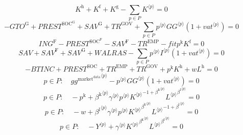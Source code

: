 \begin{equation}
K^{\mathrm{h}} + K^{\mathrm{f}} + K^{\mathrm{g}} - \sum_{p\in P} {K}^{\langle p\rangle} = 0
\end{equation}
\begin{equation}
-{G\!T\!O}^{\mathrm{G}} + {P\!R\!E\!S\!T}^{\mathrm{SOC}^{\mathrm{G}}} + {S\!A\!V}^{\mathrm{G}} + {T\!R}^{\mathrm{GOV}} + \sum_{p\in P} {{p}^{\langle p\rangle}} {{{G\!G}}^{\langle p\rangle}} \left(1 + {{v\!a\!t}}^{\langle p\rangle}\right) = 0
\end{equation}
\begin{equation}
{I\!N\!G}^{\mathrm{F}} - {P\!R\!E\!S\!T}^{\mathrm{SOC}^{\mathrm{F}}} - {S\!A\!V}^{\mathrm{F}} - {T\!R}^{\mathrm{EMP}} - {{f\!i\!t}} {p^{\mathrm{k}}} {K^{\mathrm{f}}} = 0
\end{equation}
\begin{equation}
{S\!A\!V} + {S\!A\!V}^{\mathrm{F}} + {S\!A\!V}^{\mathrm{G}} + {W\!A\!L\!R\!A\!S} - \sum_{p\in P} {{p}^{\langle p\rangle}} {{I}^{\langle p\rangle}} \left(1 + {{v\!a\!t}}^{\langle p\rangle}\right) = 0
\end{equation}
\begin{equation}
-{B\!T\!I\!N\!C} + {P\!R\!E\!S\!T}^{\mathrm{SOC}} + {T\!R}^{\mathrm{EMP}} + {T\!R}^{\mathrm{GOV}} + {p^{\mathrm{k}}} {K^{\mathrm{h}}} + {w} {L^{\mathrm{h}}} = 0
\end{equation}
\begin{equation}
p\in P\colon\quad {{g\!g}^{\mathrm{market}^{\mathrm{data}}}}^{\langle p\rangle} - {{p}^{\langle p\rangle}} {{{G\!G}}^{\langle p\rangle}} \left(1 + {{v\!a\!t}}^{\langle p\rangle}\right) = 0
\end{equation}
\begin{equation}
p\in P\colon\quad -p^{\mathrm{k}} + {{\beta^{\mathrm{k}}}^{\langle p\rangle}} {{\gamma}^{\langle p\rangle}} {{p}^{\langle p\rangle}} {{{K}^{\langle p\rangle}}^{-1 + {\beta^{\mathrm{k}}}^{\langle p\rangle}}} {{{L}^{\langle p\rangle}}^{{\beta^{\mathrm{l}}}^{\langle p\rangle}}} = 0
\end{equation}
\begin{equation}
p\in P\colon\quad -w + {{\beta^{\mathrm{l}}}^{\langle p\rangle}} {{\gamma}^{\langle p\rangle}} {{p}^{\langle p\rangle}} {{{K}^{\langle p\rangle}}^{{\beta^{\mathrm{k}}}^{\langle p\rangle}}} {{{L}^{\langle p\rangle}}^{-1 + {\beta^{\mathrm{l}}}^{\langle p\rangle}}} = 0
\end{equation}
\begin{equation}
p\in P\colon\quad -{Y}^{\langle p\rangle} + {{\gamma}^{\langle p\rangle}} {{{K}^{\langle p\rangle}}^{{\beta^{\mathrm{k}}}^{\langle p\rangle}}} {{{L}^{\langle p\rangle}}^{{\beta^{\mathrm{l}}}^{\langle p\rangle}}} = 0
\end{equation}
